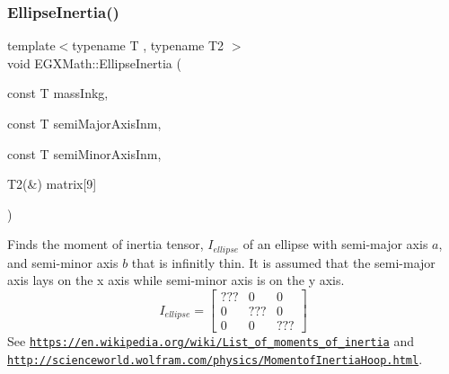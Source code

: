 \subsubsection{\texorpdfstring{Ellipse\+Inertia()}{EllipseInertia()}\hspace{0.1cm}{\footnotesize\ttfamily [1/3]}}
{\footnotesize\ttfamily template$<$typename T , typename T2 $>$ \\
void E\+G\+X\+Math\+::\+Ellipse\+Inertia (\begin{DoxyParamCaption}\item[{const T}]{mass\+Inkg,  }\item[{const T}]{semi\+Major\+Axis\+Inm,  }\item[{const T}]{semi\+Minor\+Axis\+Inm,  }\item[{T2(\&)}]{matrix\mbox{[}9\mbox{]} }\end{DoxyParamCaption})}



Finds the moment of inertia tensor, $I_{ellipse}$ of an ellipse with semi-\/major axis $a$, and semi-\/minor axis $b$ that is infinitly thin. It is assumed that the semi-\/major axis lays on the x axis while semi-\/minor axis is on the y axis. \[ I_{ellipse}=\begin{bmatrix} ??? & 0 & 0\\ 0 & ??? & 0\\ 0 & 0 & ??? \end{bmatrix} \] See \href{https://en.wikipedia.org/wiki/List_of_moments_of_inertia}{\tt https\+://en.\+wikipedia.\+org/wiki/\+List\+\_\+of\+\_\+moments\+\_\+of\+\_\+inertia} and \href{http://scienceworld.wolfram.com/physics/MomentofInertiaHoop.html}{\tt http\+://scienceworld.\+wolfram.\+com/physics/\+Momentof\+Inertia\+Hoop.\+html}. 


